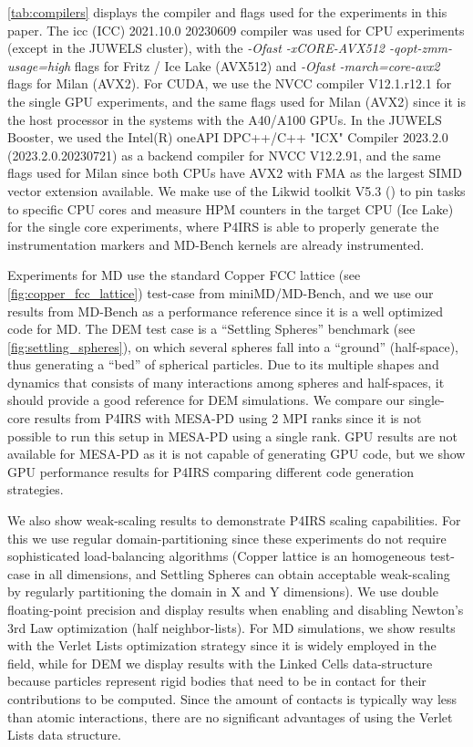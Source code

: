\documentclass[Afour,sageh,times]{sagej}
\newcommand{\RMchange}[1]{{\color{blue} #1}}
\begin{document}
\autoref{tab:compilers} \RMchange{displays the compiler and flags used for the experiments in this paper.}
The icc (ICC) 2021.10.0 20230609 compiler was used for CPU experiments (except in the JUWELS cluster), with the \emph{-Ofast -xCORE-AVX512 -qopt-zmm-usage=high} flags for Fritz / Ice Lake (AVX512) and \emph{-Ofast -march=core-avx2} flags for Milan (AVX2).
For CUDA, we use the NVCC compiler V12.1.r12.1 for the single GPU experiments, and the same flags used for Milan (AVX2) since it is the host processor in the systems with the A40/A100 GPUs.
In the JUWELS Booster, we used the Intel(R) oneAPI DPC++/C++ \RMchange{"ICX"} Compiler 2023.2.0 (2023.2.0.20230721) \RMchange{as a backend compiler for} NVCC V12.2.91, and the same flags used for Milan since both CPUs have AVX2 with FMA as the largest SIMD vector extension available.
We make use of the Likwid toolkit V5.3 (\cite{likwid}) to pin tasks to specific CPU cores and measure HPM counters in the target CPU (Ice Lake) for the single core experiments, where P4IRS is able to properly generate the instrumentation markers and MD-Bench kernels are already instrumented.

Experiments for \ac{MD} use the standard Copper FCC lattice (see \autoref{fig:copper_fcc_lattice}) test-case from miniMD/MD-Bench, and we use our results from MD-Bench as a performance reference since it is a well optimized code for \ac{MD}.
The \ac{DEM} test case is a ``Settling Spheres'' benchmark (see \autoref{fig:settling_spheres}), on which several spheres fall into a ``ground'' (half-space), thus generating a ``bed'' of spherical particles.
Due to its multiple shapes and dynamics that consists of many interactions among spheres and half-spaces, it should provide a good reference for DEM simulations.
We compare our single-core results from P4IRS with MESA-PD using 2 MPI ranks since it is not possible to run this setup in MESA-PD using a single rank.
GPU results are not available for MESA-PD as it is not capable of generating GPU code, but we show GPU performance results for P4IRS comparing different code generation strategies.

We also show weak-scaling results to demonstrate P4IRS scaling capabilities.
For this we use regular domain-partitioning since these experiments do not require sophisticated load-balancing algorithms (Copper lattice is an homogeneous test-case in all dimensions, and Settling Spheres can obtain acceptable weak-scaling by regularly partitioning the domain in X and Y dimensions).
We use double floating-point precision and display results when enabling and disabling Newton's 3rd Law optimization (half neighbor-lists).
For \ac{MD} simulations, we show results with the Verlet Lists optimization strategy since it is widely employed in the field, while for \ac{DEM} we display results with the Linked Cells data-structure because particles represent rigid bodies that need to be in contact for their contributions to be computed.
Since the amount of contacts is typically way less than atomic interactions, there are no significant advantages of using the Verlet Lists data structure.
\end{document}
